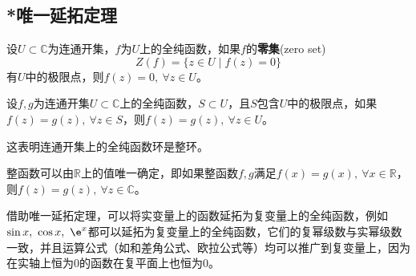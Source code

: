 \subsection{*唯一延拓定理}\label{sub:unique_exetension}
\begin{theorem}
    设$U\subset\mathbb{C}$为连通开集，$f$为$U$上的全纯函数，如果$f$的\textbf{零集}(zero set)
    \begin{equation}
        Z(f)=\{z\in U\mid f(z)=0\}
    \end{equation}
    有$U$中的极限点，则$f(z)=0,\ \forall z\in U$。
\end{theorem}
\begin{corollary}
    设$f,g$为连通开集$U\subset\mathbb{C}$上的全纯函数，$S\subset U$，且$S$包含$U$中的极限点，如果$f(z)=g(z),\ \forall z\in S$，则$f(z)=g(z),\ \forall z\in U$。
\end{corollary}
这表明连通开集上的全纯函数环是整环。
\begin{corollary}[唯一延拓定理]\label{cor:unique_continuation}
    整函数可以由$\mathbb{R}$上的值唯一确定，即如果整函数$f,g$满足$f(x)=g(x),\ \forall x\in\mathbb{R}$，则$f(z)=g(z),\ \forall z\in\mathbb{C}$。
\end{corollary}

借助唯一延拓定理，可以将实变量上的函数延拓为复变量上的全纯函数，例如$\sin x,\ \cos x,\ \e^x$都可以延拓为复变量上的全纯函数，它们的复幂级数与实幂级数一致，并且运算公式（如和差角公式、欧拉公式等）均可以推广到复变量上，因为在实轴上恒为$0$的函数在复平面上也恒为$0$。

